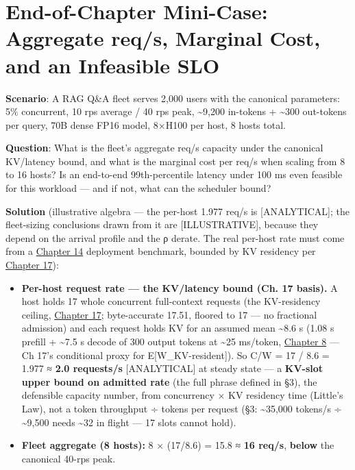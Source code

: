 \section{End-of-Chapter Mini-Case: Aggregate req/s, Marginal Cost, and
an Infeasible
SLO}\label{end-of-chapter-mini-case-aggregate-reqs-marginal-cost-and-an-infeasible-slo}

\textbf{Scenario}: A RAG Q\&A fleet serves 2,000 users with the
canonical parameters: 5\% concurrent, 10 rps average / 40 rps peak,
\textasciitilde9,200 in-tokens + \textasciitilde300 out-tokens per
query, 70B dense FP16 model, 8×H100 per host, 8 hosts total.

\textbf{Question}: What is the fleet's aggregate req/s capacity under
the canonical KV/latency bound, and what is the marginal cost per req/s
when scaling from 8 to 16 hosts? Is an end-to-end 99th-percentile
latency under 100 ms even feasible for this workload --- and if not,
what can the scheduler bound?

\textbf{Solution} (illustrative algebra --- the per-host 1.977 req/s is
\mbox{{[}ANALYTICAL{]}}; the fleet-sizing conclusions drawn from it are
\mbox{{[}ILLUSTRATIVE{]}}, because they depend on the arrival profile and the ρ
derate. The real per-host rate must come from a \hyperref[chap:14]{Chapter 14} deployment
benchmark, bounded by KV residency per \hyperref[chap:17]{Chapter 17}):

\begin{itemize}
\tightlist
\item
  \textbf{Per-host request rate --- the KV/latency bound (Ch. 17
  basis).} A host holds 17 whole concurrent full-context requests (the
  KV-residency ceiling, \hyperref[chap:17]{Chapter 17}; byte-accurate 17.51, floored to 17
  --- no fractional admission) and each request holds KV for an assumed
  mean \textasciitilde8.6 s (1.08 s prefill + \textasciitilde7.5 s
  decode of 300 output tokens at \textasciitilde25 ms/token, \hyperref[chap:8]{Chapter 8}
  --- Ch 17's conditional proxy for E{[}W\_KV-resident{]}). So C/W = 17
  / 8.6 = 1.977 ≈ \textbf{2.0 requests/s} \mbox{{[}ANALYTICAL{]}} at steady
  state --- a \textbf{KV-slot upper bound on admitted rate} (the full
  phrase defined in §3), the defensible capacity number, from
  concurrency × KV residency time (Little's Law), not a token throughput
  ÷ tokens per request (§3: \textasciitilde35,000 tokens/s ÷
  \textasciitilde9,500 needs \textasciitilde32 in flight --- 17 slots
  cannot hold).
\item
  \textbf{Fleet aggregate (8 hosts):} 8 × (17/8.6) = 15.8 ≈ \textbf{16
  req/s}, \textbf{below} the canonical 40-rps peak.
\end{itemize}

